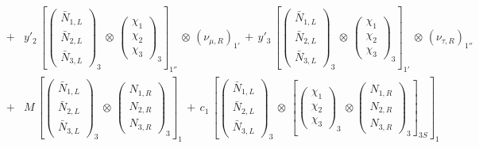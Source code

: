 \documentclass[english,10pt,aps,prd,a4paper,preprintnumbers,floatfix,nofootinbib,showpacs,superscriptaddress]{revtex4-1}
\begin{document}
\begin{eqnarray}
  \nonumber \\
  & + &
y'_2 \,   \left [ \left( \begin{array}{c}  \bar{N}_{1,L}   \\ \bar{N}_{2, L} \\ \bar{N}_{3, L} \end{array} \right)_{3} \, \otimes \, \left( \begin{array}{c} \chi_1   \\ \chi_2 \\ \chi_3 \end{array} \right)_{3} \right]_{1''}  \, \otimes \, \left(\nu_{\mu,R} \right)_{1'}
   \, + \, 
y'_3 \,   \left [ \left( \begin{array}{c}  \bar{N}_{1,L}   \\ \bar{N}_{2, L} \\ \bar{N}_{3, L} \end{array} \right)_{3} \, \otimes \, \left( \begin{array}{c} \chi_1   \\ \chi_2 \\ \chi_3 \end{array} \right)_{3} \right]_{1'}  \, \otimes \, \left(\nu_{\tau,R} \right)_{1''}
    \nonumber \\
& + &     M \,   \left[ \left( \begin{array}{c}  \bar{N}_{1,L}   \\ \bar{N}_{2, L} \\ \bar{N}_{3, L} \end{array} \right)_{3} \,
\otimes \,\left( \begin{array}{c}  N_{1,R}   \\ N_{2, R} \\ N_{3, R} \end{array} \right)_{3} \right]_1 
      \, + \, 
c_1 \, \left[ \left( \begin{array}{c}  \bar{N}_{1,L}   \\ \bar{N}_{2, L} \\ \bar{N}_{3, L} \end{array} \right)_3  \, \otimes \, \left [  \left( \begin{array}{c}  \chi_{1}   \\ \chi_{2} \\ \chi_{3} \end{array} \right)_3 \, \otimes  \left( \begin{array}{c} N_{1,R}   \\ N_{2,R} \\ N_{3, R} \end{array} \right)_{3}   \right]_{3S} \right ]_1

\end{eqnarray}
\end{document}
